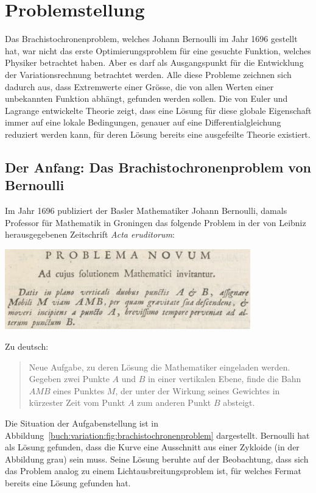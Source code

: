 %
%
%
\section{Problemstellung
\label{buch:variation:section:problemstellung}}
Das Brachistochronenproblem, welches Johann Bernoulli im Jahr 1696
gestellt hat, war nicht das erste Optimierungsproblem für eine 
gesuchte Funktion, welches Physiker betrachtet haben.
Aber es darf als Ausgangspunkt für die Entwicklung der Variationsrechnung
betrachtet werden.
Alle diese Probleme zeichnen sich dadurch aus, dass Extremwerte
einer Grösse, die von allen Werten einer unbekannten Funktion abhängt,
gefunden werden sollen.
Die von Euler und Lagrange entwickelte Theorie zeigt, dass eine
Lösung für diese globale Eigenschaft immer auf eine lokale Bedingungen,
genauer auf eine Differentialgleichung reduziert werden kann, für deren
Lösung bereits eine ausgefeilte Theorie existiert.

%
%
\subsection{Der Anfang: Das Brachistochronenproblem von Bernoulli}

Im Jahr 1696 publiziert der Basler Mathematiker Johann Bernoulli, damals
Professor für Mathematik in Groningen das folgende Problem in der
von Leibniz herausgegebenen Zeitschrift {\em Acta eruditorum}:
\begin{center}
\includegraphics[width=0.8\textwidth]{chapters/020-variation/images/latein.jpg}
\end{center}
Zu deutsch:
\begin{quote}
Neue Aufgabe, zu deren Lösung die Mathematiker eingeladen werden.
Gegeben zwei Punkte $A$ und $B$ in einer vertikalen Ebene, finde
die Bahn $AMB$ eines Punktes $M$, der unter der Wirkung seines
Gewichtes in kürzester Zeit vom Punkt $A$ zum anderen Punkt $B$ absteigt.
\end{quote}
Die Situation der Aufgabenstellung ist in
Abbildung~\ref{buch:variation:fig:brachistochronenproblem}
dargestellt.
Bernoulli hat als Lösung gefunden, dass die Kurve eine Ausschnitt
aus einer Zykloide (in der Abbildung grau) sein muss.
Seine Lösung beruhte auf der Beobachtung, dass sich das Problem analog
zu einem Lichtausbreitungsproblem ist, für welches Fermat bereits
eine Lösung gefunden hat.

